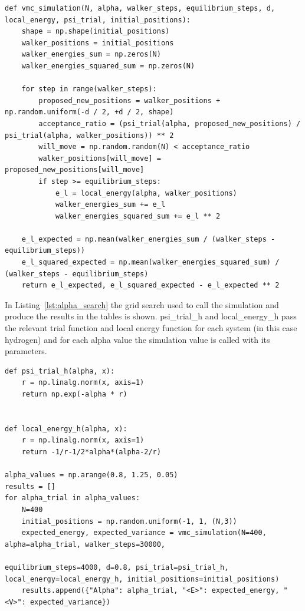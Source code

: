 \documentclass[a4paper, 11pt]{article}          %
\begin{document}
    \begin{lstlisting}[style=pythonstyle, caption={Main simulation method}, label={lst:simulation}]
def vmc_simulation(N, alpha, walker_steps, equilibrium_steps, d, local_energy, psi_trial, initial_positions):
    shape = np.shape(initial_positions)
    walker_positions = initial_positions
    walker_energies_sum = np.zeros(N)
    walker_energies_squared_sum = np.zeros(N)

    for step in range(walker_steps):
        proposed_new_positions = walker_positions + np.random.uniform(-d / 2, +d / 2, shape)
        acceptance_ratio = (psi_trial(alpha, proposed_new_positions) / psi_trial(alpha, walker_positions)) ** 2
        will_move = np.random.random(N) < acceptance_ratio
        walker_positions[will_move] = proposed_new_positions[will_move]
        if step >= equilibrium_steps:
            e_l = local_energy(alpha, walker_positions)
            walker_energies_sum += e_l
            walker_energies_squared_sum += e_l ** 2

    e_l_expected = np.mean(walker_energies_sum / (walker_steps - equilibrium_steps))
    e_l_squared_expected = np.mean(walker_energies_squared_sum) / (walker_steps - equilibrium_steps)
    return e_l_expected, e_l_squared_expected - e_l_expected ** 2
    \end{lstlisting}

    In Listing~\ref{lst:alpha_search} the grid search used to call the simulation and produce the results in the tables is shown. psi\_trial\_h and local\_energy\_h pass the relevant trial function and local energy function for each system (in this case hydrogen) and for each alpha value the simulation value is called with its parameters.

    \begin{lstlisting}[style=pythonstyle, caption={Alpha grid search for the hydrogen atom}, label={lst:alpha_search}]
def psi_trial_h(alpha, x):
    r = np.linalg.norm(x, axis=1)
    return np.exp(-alpha * r)


def local_energy_h(alpha, x):
    r = np.linalg.norm(x, axis=1)
    return -1/r-1/2*alpha*(alpha-2/r)

alpha_values = np.arange(0.8, 1.25, 0.05)
results = []
for alpha_trial in alpha_values:
    N=400
    initial_positions = np.random.uniform(-1, 1, (N,3))
    expected_energy, expected_variance = vmc_simulation(N=400, alpha=alpha_trial, walker_steps=30000,
                                                        equilibrium_steps=4000, d=0.8, psi_trial=psi_trial_h, local_energy=local_energy_h, initial_positions=initial_positions)
    results.append({"Alpha": alpha_trial, "<E>": expected_energy, "<V>": expected_variance})
    \end{lstlisting}


    \printbibliography

\end{document}
